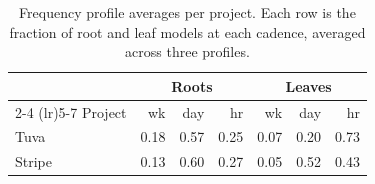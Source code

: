
\begin{table}[tb]
\centering
\caption{Frequency profile averages per project. Each row is the fraction of root and leaf models at each cadence, averaged across three profiles.}
\inv
\label{tab:freq-profiles}
\small
\begin{tabular}{lrrrrrr}
\toprule
& \multicolumn{3}{c}{Roots} & \multicolumn{3}{c}{Leaves} \\
\cmidrule(lr){2-4} \cmidrule(lr){5-7}
Project & wk & day & hr & wk & day & hr \\
\midrule
Tuva   & 0.18 & 0.57 & 0.25 & 0.07 & 0.20 & 0.73 \\
Stripe & 0.13 & 0.60 & 0.27 & 0.05 & 0.52 & 0.43 \\
\bottomrule
\end{tabular}
\inv
\end{table}

